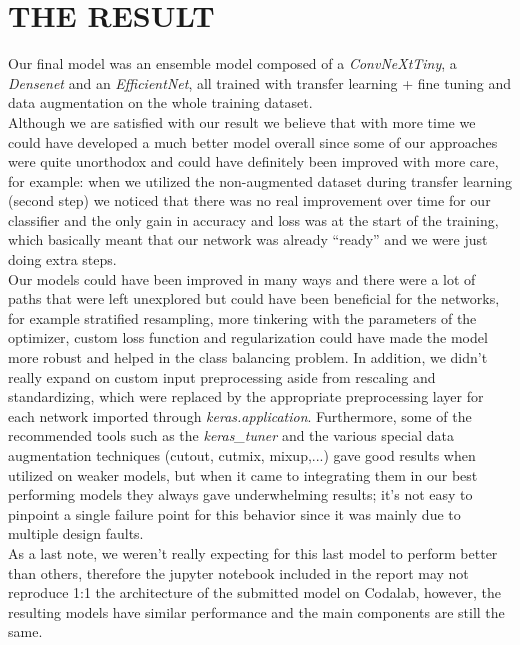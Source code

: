 \documentclass[11pt]{report}
\begin{document}
\section{THE RESULT}
Our final model was an ensemble model composed of a \textit{ConvNeXtTiny}, a \textit{Densenet} and an \textit{EfficientNet}, all trained with transfer learning + fine tuning and data augmentation on the whole training dataset. \\
Although we are satisfied with our result we believe that with more time we could have developed a much better model overall since some of our approaches were quite unorthodox and could have definitely been improved with more care, for example: when we utilized the non-augmented dataset during transfer learning (second step) we noticed that there was no real improvement over time for our classifier and the only gain in accuracy and loss was at the start of the training, which basically meant that our network was already “ready” and we were just doing extra steps. \\
Our models could have been improved in many ways and there were a lot of paths that were left unexplored but could have been beneficial for the networks, for example stratified resampling, more tinkering with the parameters of the optimizer, custom loss function and regularization could have made the model more robust and helped in the class balancing problem.
In addition, we didn’t really expand on custom input preprocessing aside from rescaling and standardizing, which were replaced by the appropriate preprocessing layer for each network imported through \textit{keras.application}.
Furthermore, some of the recommended tools such as the \textit{keras\_tuner} and the various special data augmentation techniques (cutout, cutmix, mixup,...) gave good results when utilized on weaker models, but when it came to integrating them in our best performing models they always gave underwhelming results; it’s not easy to pinpoint a single failure point for this behavior since it was mainly due to multiple design faults. \\
As a last note, we weren’t really expecting for this last model to perform better than others, therefore the jupyter notebook included in the report may not reproduce 1:1 the architecture of the submitted model on Codalab, however, the resulting models have similar performance and the main components are still the same.
\end{document}

